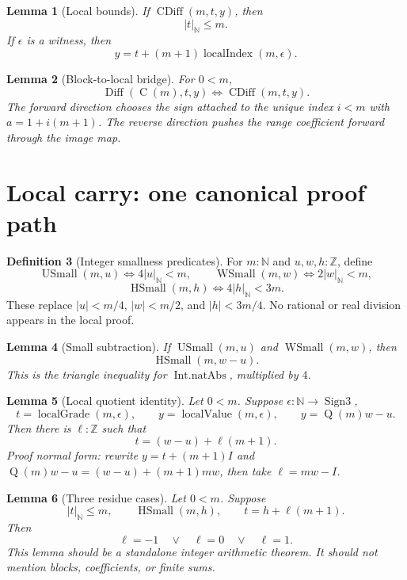 \documentclass[11pt]{article}
\theoremstyle{definition}
\newtheorem{definition}{Definition}[section]
\theoremstyle{plain}
\newtheorem{lemma}[definition]{Lemma}
\theoremstyle{remark}
\newcommand{\N}{\mathbb{N}}
\newcommand{\Z}{\mathbb{Z}}
\newcommand{\Sgn}{\operatorname{Sign3}}
\newcommand{\nabs}[1]{\left|#1\right|_{\N}}
\newcommand{\Diff}{\operatorname{Diff}}
\newcommand{\Cblock}{\operatorname{C}}
\newcommand{\Qfun}{\operatorname{Q}}
\newcommand{\CDiff}{\operatorname{CDiff}}
\newcommand{\LGrade}{\operatorname{localGrade}}
\newcommand{\LIndex}{\operatorname{localIndex}}
\newcommand{\LVal}{\operatorname{localValue}}
\newcommand{\USmall}{\operatorname{USmall}}
\newcommand{\WSmall}{\operatorname{WSmall}}
\newcommand{\HSmall}{\operatorname{HSmall}}
\begin{document}
\begin{lemma}[Local bounds]\label{lem:v9-cdiff-bounds}
If \(\CDiff(m,t,y)\), then
\[
        \nabs t\le m.
\]
If \(\epsilon\) is a witness, then
\[
        y=t+(m+1)\LIndex(m,\epsilon).
\]
\end{lemma}

\begin{lemma}[Block-to-local bridge]\label{lem:v9-block-to-local}
For \(0<m\),
\[
        \Diff(\Cblock(m),t,y)\Longleftrightarrow \CDiff(m,t,y).
\]
The forward direction chooses the sign attached to the unique index \(i<m\) with \(a=1+i(m+1)\).  The reverse direction pushes the range coefficient forward through the image map.
\end{lemma}

\section{Local carry: one canonical proof path}

\begin{definition}[Integer smallness predicates]\label{def:v9-local-small}
For \(m:\N\) and \(u,w,h:\Z\), define
\[
        \USmall(m,u)\Longleftrightarrow 4\nabs u<m,
        \qquad
        \WSmall(m,w)\Longleftrightarrow 2\nabs w<m,
\]
\[
        \HSmall(m,h)\Longleftrightarrow 4\nabs h<3m.
\]
These replace \(|u|<m/4\), \(|w|<m/2\), and \(|h|<3m/4\).  No rational or real division appears in the local proof.
\end{definition}

\begin{lemma}[Small subtraction]\label{lem:v9-small-sub}
If \(\USmall(m,u)\) and \(\WSmall(m,w)\), then
\[
        \HSmall(m,w-u).
\]
This is the triangle inequality for \(\operatorname{Int.natAbs}\), multiplied by \(4\).
\end{lemma}

\begin{lemma}[Local quotient identity]\label{lem:v9-local-quotient}
Let \(0<m\).  Suppose \(\epsilon:\N\to\Sgn\),
\[
        t=\LGrade(m,\epsilon),
        \qquad
        y=\LVal(m,\epsilon),
        \qquad
        y=\Qfun(m)w-u.
\]
Then there is \(\ell:\Z\) such that
\[
        t=(w-u)+\ell(m+1).
\]
Proof normal form: rewrite \(y=t+(m+1)I\) and \(\Qfun(m)w-u=(w-u)+(m+1)mw\), then take \(\ell=mw-I\).
\end{lemma}

\begin{lemma}[Three residue cases]\label{lem:v9-three-residue-cases}
Let \(0<m\).  Suppose
\[
        \nabs t\le m,
        \qquad
        \HSmall(m,h),
        \qquad
        t=h+\ell(m+1).
\]
Then
\[
        \ell=-1\quad\vee\quad \ell=0\quad\vee\quad \ell=1.
\]
This lemma should be a standalone integer arithmetic theorem.  It should not mention blocks, coefficients, or finite sums.
\end{lemma}
\end{document}
